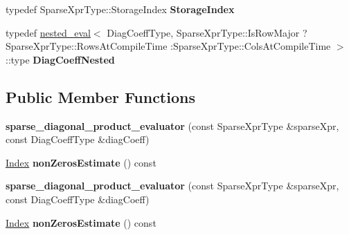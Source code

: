 \begin{DoxyCompactItemize}
typedef Sparse\+Xpr\+Type\+::\+Storage\+Index {\bfseries Storage\+Index}
\item 
\mbox{\label{struct_eigen_1_1internal_1_1sparse__diagonal__product__evaluator_3_01_sparse_xpr_type_00_01_diag5c533b27b8fe485cf13e7ad699b99003_a5643daa5d8bda695a2452f53a3bf0c17}} 
typedef \hyperlink{struct_eigen_1_1internal_1_1nested__eval}{nested\+\_\+eval}$<$ Diag\+Coeff\+Type, Sparse\+Xpr\+Type\+::\+Is\+Row\+Major ? Sparse\+Xpr\+Type\+::\+Rows\+At\+Compile\+Time \+:Sparse\+Xpr\+Type\+::\+Cols\+At\+Compile\+Time $>$\+::type {\bfseries Diag\+Coeff\+Nested}
\end{DoxyCompactItemize}
\subsection*{Public Member Functions}
\begin{DoxyCompactItemize}
\item 
\mbox{\label{struct_eigen_1_1internal_1_1sparse__diagonal__product__evaluator_3_01_sparse_xpr_type_00_01_diag5c533b27b8fe485cf13e7ad699b99003_af38a1fdbcec00837065684a356004d77}} 
{\bfseries sparse\+\_\+diagonal\+\_\+product\+\_\+evaluator} (const Sparse\+Xpr\+Type \&sparse\+Xpr, const Diag\+Coeff\+Type \&diag\+Coeff)
\item 
\mbox{\label{struct_eigen_1_1internal_1_1sparse__diagonal__product__evaluator_3_01_sparse_xpr_type_00_01_diag5c533b27b8fe485cf13e7ad699b99003_a542f770b604b2d8c009169b23fe05265}} 
\hyperlink{namespace_eigen_a62e77e0933482dafde8fe197d9a2cfde}{Index} {\bfseries non\+Zeros\+Estimate} () const
\item 
\mbox{\label{struct_eigen_1_1internal_1_1sparse__diagonal__product__evaluator_3_01_sparse_xpr_type_00_01_diag5c533b27b8fe485cf13e7ad699b99003_af38a1fdbcec00837065684a356004d77}} 
{\bfseries sparse\+\_\+diagonal\+\_\+product\+\_\+evaluator} (const Sparse\+Xpr\+Type \&sparse\+Xpr, const Diag\+Coeff\+Type \&diag\+Coeff)
\item 
\mbox{\label{struct_eigen_1_1internal_1_1sparse__diagonal__product__evaluator_3_01_sparse_xpr_type_00_01_diag5c533b27b8fe485cf13e7ad699b99003_a542f770b604b2d8c009169b23fe05265}} 
\hyperlink{namespace_eigen_a62e77e0933482dafde8fe197d9a2cfde}{Index} {\bfseries non\+Zeros\+Estimate} () const
\end{DoxyCompactItemize}
